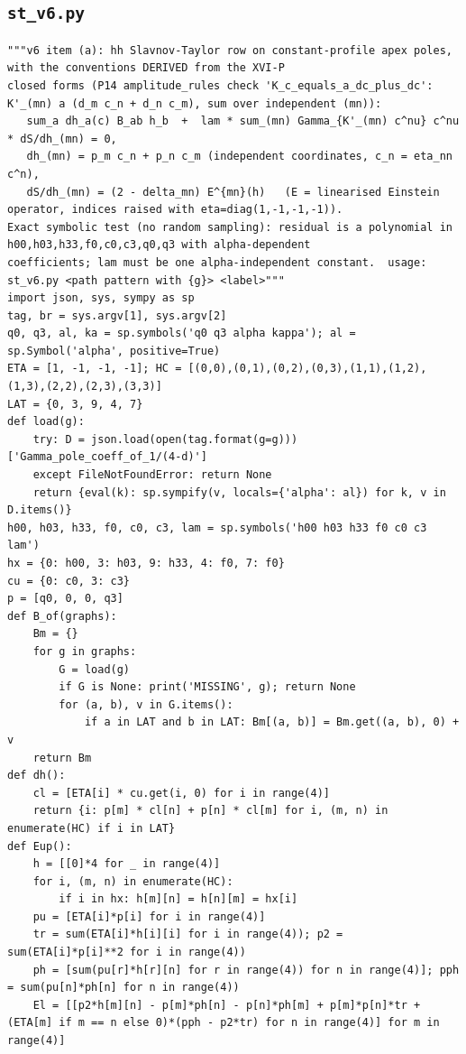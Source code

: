 \documentclass[10pt]{article}
\begin{document}
\subsection{\texttt{st\_v6.py}}
\begin{lstlisting}
"""v6 item (a): hh Slavnov-Taylor row on constant-profile apex poles, with the conventions DERIVED from the XVI-P
closed forms (P14 amplitude_rules check 'K_c_equals_a_dc_plus_dc': K'_(mn) a (d_m c_n + d_n c_m), sum over independent (mn)):
   sum_a dh_a(c) B_ab h_b  +  lam * sum_(mn) Gamma_{K'_(mn) c^nu} c^nu * dS/dh_(mn) = 0,
   dh_(mn) = p_m c_n + p_n c_m (independent coordinates, c_n = eta_nn c^n),
   dS/dh_(mn) = (2 - delta_mn) E^{mn}(h)   (E = linearised Einstein operator, indices raised with eta=diag(1,-1,-1,-1)).
Exact symbolic test (no random sampling): residual is a polynomial in h00,h03,h33,f0,c0,c3,q0,q3 with alpha-dependent
coefficients; lam must be one alpha-independent constant.  usage: st_v6.py <path pattern with {g}> <label>"""
import json, sys, sympy as sp
tag, br = sys.argv[1], sys.argv[2]
q0, q3, al, ka = sp.symbols('q0 q3 alpha kappa'); al = sp.Symbol('alpha', positive=True)
ETA = [1, -1, -1, -1]; HC = [(0,0),(0,1),(0,2),(0,3),(1,1),(1,2),(1,3),(2,2),(2,3),(3,3)]
LAT = {0, 3, 9, 4, 7}
def load(g):
    try: D = json.load(open(tag.format(g=g)))['Gamma_pole_coeff_of_1/(4-d)']
    except FileNotFoundError: return None
    return {eval(k): sp.sympify(v, locals={'alpha': al}) for k, v in D.items()}
h00, h03, h33, f0, c0, c3, lam = sp.symbols('h00 h03 h33 f0 c0 c3 lam')
hx = {0: h00, 3: h03, 9: h33, 4: f0, 7: f0}
cu = {0: c0, 3: c3}
p = [q0, 0, 0, q3]
def B_of(graphs):
    Bm = {}
    for g in graphs:
        G = load(g)
        if G is None: print('MISSING', g); return None
        for (a, b), v in G.items():
            if a in LAT and b in LAT: Bm[(a, b)] = Bm.get((a, b), 0) + v
    return Bm
def dh():
    cl = [ETA[i] * cu.get(i, 0) for i in range(4)]
    return {i: p[m] * cl[n] + p[n] * cl[m] for i, (m, n) in enumerate(HC) if i in LAT}
def Eup():
    h = [[0]*4 for _ in range(4)]
    for i, (m, n) in enumerate(HC):
        if i in hx: h[m][n] = h[n][m] = hx[i]
    pu = [ETA[i]*p[i] for i in range(4)]
    tr = sum(ETA[i]*h[i][i] for i in range(4)); p2 = sum(ETA[i]*p[i]**2 for i in range(4))
    ph = [sum(pu[r]*h[r][n] for r in range(4)) for n in range(4)]; pph = sum(pu[n]*ph[n] for n in range(4))
    El = [[p2*h[m][n] - p[m]*ph[n] - p[n]*ph[m] + p[m]*p[n]*tr + (ETA[m] if m == n else 0)*(pph - p2*tr) for n in range(4)] for m in range(4)]

\end{lstlisting}
\end{document}
